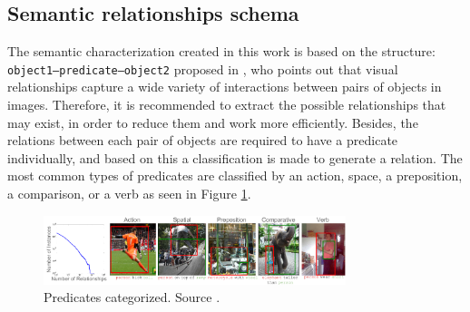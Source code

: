 \subsection{Semantic relationships schema}

The semantic characterization created in this work is based on the structure: \texttt{object1--predicate--object2} proposed in \cite{Cewu}, who points out that visual relationships capture a wide variety of interactions between pairs of objects in images. Therefore, it is recommended to extract the possible relationships that may exist, in order to reduce them and work more efficiently. Besides, the relations between each pair of objects are required to have a predicate individually, and based on this a classification is made to generate a relation. The most common types of predicates are classified by an action, space, a preposition, a comparison, or a verb as seen in Figure \ref{fig:predaCar}.

\begin{figure}[H]
    \centering
    \includegraphics[width=8.8cm]{figures/predica.png}
    \caption{Predicates categorized. Source \cite{Cewu}.}
    \label{fig:predaCar}
\end{figure}

